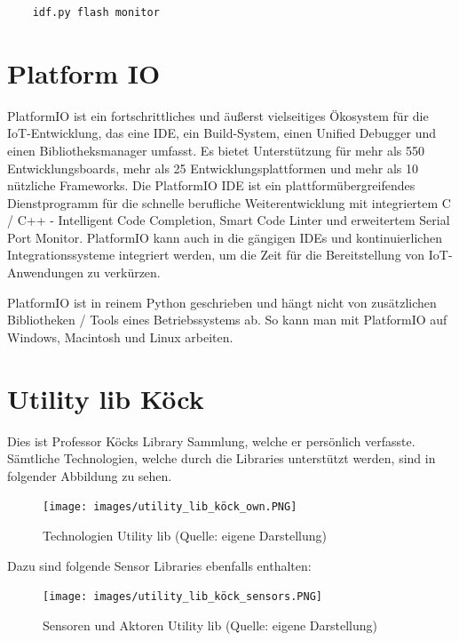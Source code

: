\begin{verbatim}
    idf.py flash monitor
\end{verbatim}


\section{Platform IO}\label{sec:platformio}

PlatformIO ist ein fortschrittliches und äußerst vielseitiges Ökosystem für die IoT-Entwicklung, das eine IDE, ein Build-System, einen Unified Debugger und einen Bibliotheksmanager umfasst. Es bietet Unterstützung für mehr als 550 Entwicklungsboards, mehr als 25 Entwicklungsplattformen und mehr als 10 nützliche Frameworks. Die PlatformIO IDE ist ein plattformübergreifendes Dienstprogramm für die schnelle berufliche Weiterentwicklung mit integriertem C / C++ - Intelligent Code Completion, Smart Code Linter und erweitertem Serial Port Monitor. PlatformIO kann auch in die gängigen IDEs und kontinuierlichen Integrationssysteme integriert werden, um die Zeit für die Bereitstellung von IoT-Anwendungen zu verkürzen.\cite{platformio_about_us}

PlatformIO ist in reinem Python geschrieben und hängt nicht von zusätzlichen Bibliotheken / Tools eines Betriebssystems ab. So kann man mit PlatformIO auf Windows, Macintosh und Linux arbeiten.

\pagebreak

\section{Utility lib Köck}\label{sec:utility-lib-koeck}
Dies ist Professor Köcks Library Sammlung, welche er persönlich verfasste. Sämtliche Technologien, welche durch die Libraries unterstützt werden, sind in folgender Abbildung zu sehen.

\begin{figure}[H]
    \begin{center}
        \texttt{[image: images/utility\_lib\_köck\_own.PNG]}
        \caption{Technologien Utility lib (Quelle: eigene Darstellung)}
    \end{center}
\end{figure}

\pagebreak
Dazu sind folgende Sensor Libraries ebenfalls enthalten:

\begin{figure}[H]
    \begin{center}
        \texttt{[image: images/utility\_lib\_köck\_sensors.PNG]}
        \caption{Sensoren und Aktoren Utility lib (Quelle: eigene Darstellung)}
    \end{center}
\end{figure}

